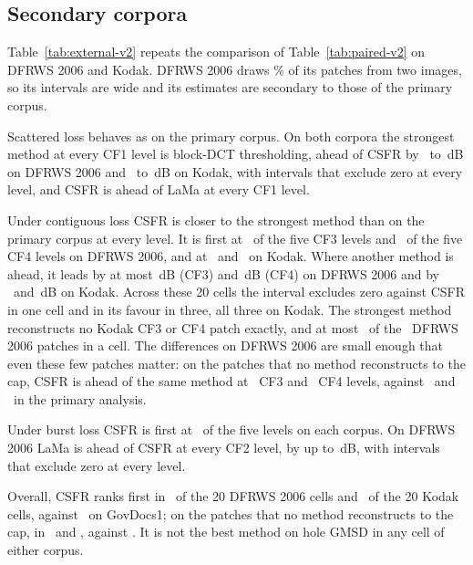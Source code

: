 \documentclass[final,3p]{elsarticle}
\begin{document}
\subsection{Secondary corpora}
\label{sec:results:external}

Table~\ref{tab:external-v2} repeats the comparison of Table~\ref{tab:paired-v2} on DFRWS 2006 and Kodak. DFRWS 2006 draws \corpusDfrwsTopTwoShare\% of its patches from two images, so its intervals are wide and its estimates are secondary to those of the primary corpus.

Scattered loss behaves as on the primary corpus. On both corpora the strongest method at every CF1 level is block-DCT thresholding, ahead of CSFR by \qDfrwsCFoneBehindMin\ to \qDfrwsCFoneBehindMax\,dB on DFRWS 2006 and \qKodakCFoneBehindMin\ to \qKodakCFoneBehindMax\,dB on Kodak, with intervals that exclude zero at every level, and CSFR is ahead of LaMa at every CF1 level.

Under contiguous loss CSFR is closer to the strongest method than on the primary corpus at every level. It is first at \qDfrwsCFthreeNFirst\ of the five CF3 levels and \qDfrwsCFfourNFirst\ of the five CF4 levels on DFRWS 2006, and at \qKodakCFthreeNFirst\ and \qKodakCFfourNFirst\ on Kodak. Where another method is ahead, it leads by at most \qDfrwsCFthreeBehindMax\,dB (CF3) and \qDfrwsCFfourBehindMax\,dB (CF4) on DFRWS 2006 and by \qKodakCFthreeBehindMax\ and \qKodakCFfourBehindMax\,dB on Kodak. Across these 20 cells the interval excludes zero against CSFR in one cell and in its favour in three, all three on Kodak. The strongest method reconstructs no Kodak CF3 or CF4 patch exactly, and at most \mechDfrwsContigCappedMax\ of the \corpusDfrwsN\ DFRWS 2006 patches in a cell. The differences on DFRWS 2006 are small enough that even these few patches matter: on the patches that no method reconstructs to the cap, CSFR is ahead of the same method at \qDfrwsCFthreeCapfreeNAhead\ CF3 and \qDfrwsCFfourCapfreeNAhead\ CF4 levels, against \qDfrwsCFthreeNFirst\ and \qDfrwsCFfourNFirst\ in the primary analysis.

Under burst loss CSFR is first at \qDfrwsCFtwoNFirst\ of the five levels on each corpus. On DFRWS 2006 LaMa is ahead of CSFR at every CF2 level, by up to \qDfrwsCFtwoLamaBehindMax\,dB, with intervals that exclude zero at every level.

Overall, CSFR ranks first in \qDfrwsNFirst\ of the 20 DFRWS 2006 cells and \qKodakNFirst\ of the 20 Kodak cells, against \qGovNFirst\ on GovDocs1; on the patches that no method reconstructs to the cap, in \qDfrwsCapfreeNFirst\ and \qKodakCapfreeNFirst, against \qGovCapfreeNFirst. It is not the best method on hole GMSD in any cell of either corpus.
\end{document}
